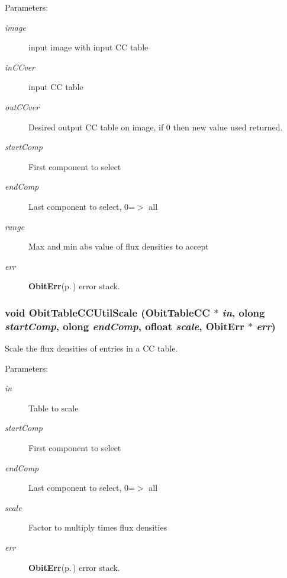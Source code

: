 \begin{Desc}
\item[Parameters:]
\begin{description}
\item[{\em image}]input image with input CC table \item[{\em in\-CCver}]input CC table \item[{\em out\-CCver}]Desired output CC table on image, if 0 then new value used returned. \item[{\em start\-Comp}]First component to select \item[{\em end\-Comp}]Last component to select, 0=$>$ all \item[{\em range}]Max and min abs value of flux densities to accept \item[{\em err}]{\bf Obit\-Err}{\rm (p.\,\pageref{structObitErr})} error stack. \end{description}
\end{Desc}
\subsubsection{\setlength{\rightskip}{0pt plus 5cm}void Obit\-Table\-CCUtil\-Scale ({\bf Obit\-Table\-CC} $\ast$ {\em in}, {\bf olong} {\em start\-Comp}, {\bf olong} {\em end\-Comp}, {\bf ofloat} {\em scale}, {\bf Obit\-Err} $\ast$ {\em err})}\label{ObitTableCCUtil_8c_a11}


Scale the flux densities of entries in a CC table. 

\begin{Desc}
\item[Parameters:]
\begin{description}
\item[{\em in}]Table to scale \item[{\em start\-Comp}]First component to select \item[{\em end\-Comp}]Last component to select, 0=$>$ all \item[{\em scale}]Factor to multiply times flux densities \item[{\em err}]{\bf Obit\-Err}{\rm (p.\,\pageref{structObitErr})} error stack. \end{description}
\end{Desc}

